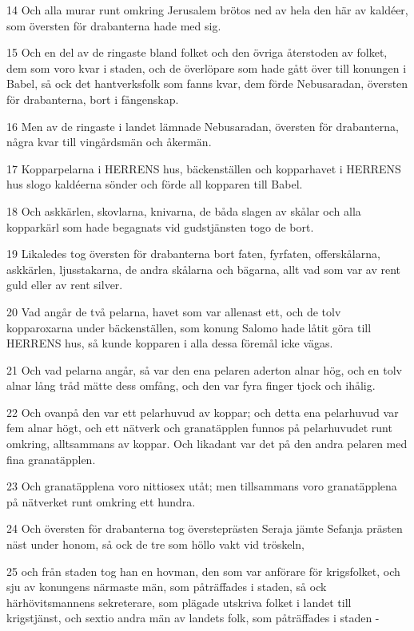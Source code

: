 \par 14 Och alla murar runt omkring Jerusalem brötos ned av hela den här av kaldéer, som översten för drabanterna hade med sig.
\par 15 Och en del av de ringaste bland folket och den övriga återstoden av folket, dem som voro kvar i staden, och de överlöpare som hade gått över till konungen i Babel, så ock det hantverksfolk som fanns kvar, dem förde Nebusaradan, översten för drabanterna, bort i fångenskap.
\par 16 Men av de ringaste i landet lämnade Nebusaradan, översten för drabanterna, några kvar till vingårdsmän och åkermän.
\par 17 Kopparpelarna i HERRENS hus, bäckenställen och kopparhavet i HERRENS hus slogo kaldéerna sönder och förde all kopparen till Babel.
\par 18 Och askkärlen, skovlarna, knivarna, de båda slagen av skålar och alla kopparkärl som hade begagnats vid gudstjänsten togo de bort.
\par 19 Likaledes tog översten för drabanterna bort faten, fyrfaten, offerskålarna, askkärlen, ljusstakarna, de andra skålarna och bägarna, allt vad som var av rent guld eller av rent silver.
\par 20 Vad angår de två pelarna, havet som var allenast ett, och de tolv kopparoxarna under bäckenställen, som konung Salomo hade låtit göra till HERRENS hus, så kunde kopparen i alla dessa föremål icke vägas.
\par 21 Och vad pelarna angår, så var den ena pelaren aderton alnar hög, och en tolv alnar lång tråd mätte dess omfång, och den var fyra finger tjock och ihålig.
\par 22 Och ovanpå den var ett pelarhuvud av koppar; och detta ena pelarhuvud var fem alnar högt, och ett nätverk och granatäpplen funnos på pelarhuvudet runt omkring, alltsammans av koppar. Och likadant var det på den andra pelaren med fina granatäpplen.
\par 23 Och granatäpplena voro nittiosex utåt; men tillsammans voro granatäpplena på nätverket runt omkring ett hundra.
\par 24 Och översten för drabanterna tog översteprästen Seraja jämte Sefanja prästen näst under honom, så ock de tre som höllo vakt vid tröskeln,
\par 25 och från staden tog han en hovman, den som var anförare för krigsfolket, och sju av konungens närmaste män, som påträffades i staden, så ock härhövitsmannens sekreterare, som plägade utskriva folket i landet till krigstjänst, och sextio andra män av landets folk, som påträffades i staden -
